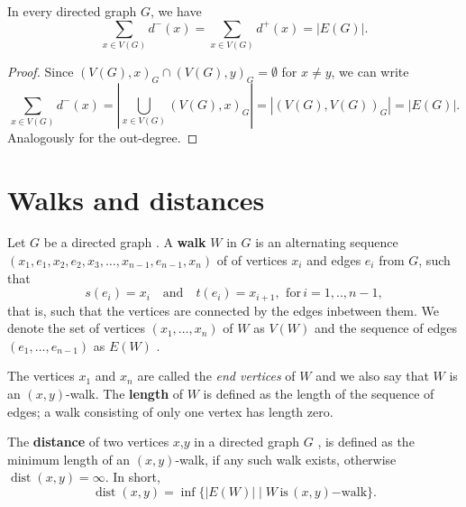 \begin{proposition}
  In every directed graph $G$, we have
  \[
  \sum_{x \in V(G)} d^-(x) = \sum_{x \in V(G)} d^+(x) = | E(G) |.
  \]
\end{proposition}

\begin{proof}
  Since $(V(G),x)_G \cap (V(G),y)_G = \emptyset$ for $x \ne y$, we can
  write
  \[
  \sum_{x \in V(G)} d^-(x) = \left| \bigcup_{x \in V(G)} (V(G),x)_G
  \right| = \left| (V(G),V(G))_G \right| = | E(G) |.
  \]
  Analogously for the out-degree.
\end{proof}




  \section{Walks and distances}\label{sec:walks_and_distances}



Let $G$ be a directed graph . A
\textbf{walk} $W$ in $G$ is an alternating sequence
$(x_1,e_1,x_2,e_2,x_3,\ldots,x_{n-1},e_{n-1},x_n)$ of of vertices
$x_i$ and edges $e_i$ from $G$, such that
\[
s(e_i) = x_i \quad \mathrm{and} \quad t(e_i) = x_{i+1}, \:\,
\mathrm{for}\, i=1,..,n-1,
\]
that is, such that the vertices are connected by the edges inbetween
them. We denote the set of vertices $(x_1,\ldots,x_n)$ of $W$ as
$V(W)$ and the sequence of edges $(e_1,\dots,e_{n-1})$ as $E(W)$
.

The vertices $x_1$ and $x_n$ are called the \textit{end vertices} of
$W$ and we also say that $W$ is an $(x,y)$-walk. The \textbf{length}
of $W$ is defined as the length of the sequence of edges; a walk
consisting of only one vertex has length zero. 


\begin{definition}[Distance]
  The \textbf{distance} of two vertices $x$,$y$ in a directed graph
  $G$ , is defined as the minimum length of an
  $(x,y)$-walk, if any such walk exists, otherwise
  $\operatorname{dist}(x,y)=\infty$. In short,
  \[
  \operatorname{dist}(x,y) = \inf \{|E(W)| \mid
  W\,\mathrm{is}\,(x,y)\mathrm{-walk}\}.
  \]
\end{definition}

